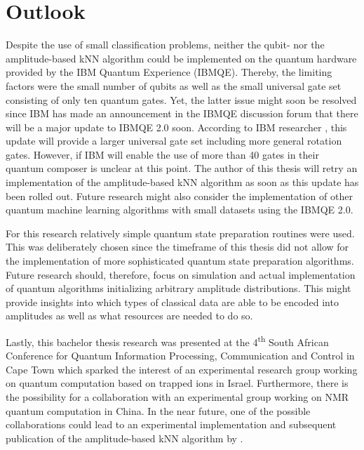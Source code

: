 \chapter{Outlook}\label{sec:outlook}

Despite the use of small classification problems, neither the qubit- nor the amplitude-based kNN algorithm could be implemented on the quantum hardware provided by the IBM Quantum Experience (IBMQE). Thereby, the limiting factors were the small number of qubits as well as the small universal gate set consisting of only ten quantum gates. Yet, the latter issue might soon be resolved since IBM has made an announcement in the IBMQE discussion forum that there will be a major update to IBMQE 2.0 soon. According to IBM researcher , this update will provide a larger universal gate set including more general rotation gates. However, if IBM will enable the use of more than 40 gates in their quantum composer is unclear at this point. The author of this thesis will retry an implementation of the amplitude-based kNN algorithm as soon as this update has been rolled out. Future research might also consider the implementation of other quantum machine learning algorithms with small datasets using the IBMQE 2.0.

For this research relatively simple quantum state preparation routines were used. This was deliberately chosen since the timeframe of this thesis did not allow for the implementation of more sophisticated quantum state preparation algorithms. Future research should, therefore, focus on simulation and actual implementation of quantum algorithms initializing arbitrary amplitude distributions. This might provide insights into which types of classical data are able to be encoded into amplitudes as well as what resources are needed to do so.

Lastly, this bachelor thesis research was presented at the 4\textsuperscript{th} South African Conference for Quantum Information Processing, Communication and Control in Cape Town which sparked the interest of an experimental research group working on quantum computation based on trapped ions in Israel. Furthermore, there is the possibility for a collaboration with an experimental group working on NMR quantum computation in China. In the near future, one of the possible collaborations could lead to an experimental implementation and subsequent publication of the amplitude-based kNN algorithm by .

